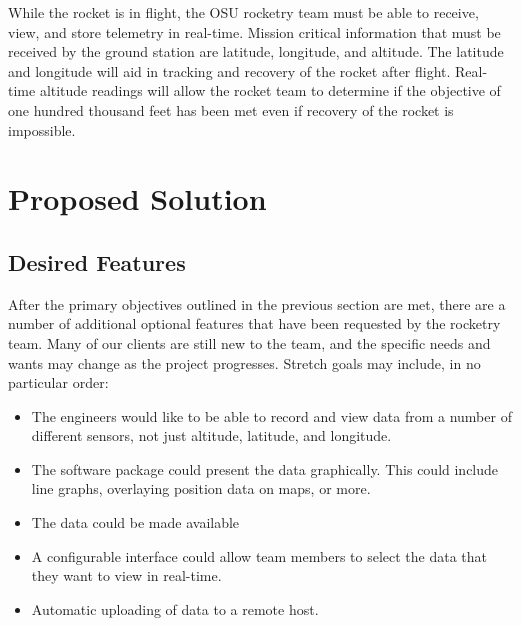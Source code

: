 \documentclass[10pt,journal,draftclsnofoot,onecolumn]{IEEEtran}
\begin{document}
	While the rocket is in flight, the \ac{OSU} rocketry team
	must be able to receive, view, and store telemetry in real-time.
	Mission critical information that must be received by the ground
	station are latitude, longitude, and altitude. The latitude
	and longitude will aid in tracking and recovery of the rocket
	after flight. Real-time altitude readings will allow the rocket
	team to determine if the objective of one hundred thousand feet
	has been met even if recovery of the rocket is impossible.
	
	
	\section{Proposed Solution}
	
	\subsection{Desired Features}
	After the primary objectives outlined in the previous section
	are met, there are a number of additional optional features
	that have been requested by the rocketry team.
	Many of our clients are still new to the team, and the specific
	needs and wants may change as the project progresses.
	Stretch goals may include, in no particular order:
	
	\begin{itemize}
		\item The engineers would like to be able to record and view data
		from a number of different sensors, not just altitude,
		latitude, and longitude.
		
		\item The software package could present the data graphically.
		This could include line graphs, overlaying position data
		on maps, or more.
		
		\item The data could be made available 
		
		\item A configurable interface could allow team members
		to select the data that they want to view in real-time.
		
		\item Automatic uploading of data to a remote host.
		
	\end{itemize}
	
\end{document}
